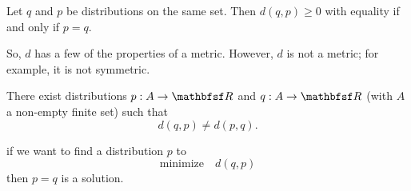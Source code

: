 \begin{prop}

Let $q$ and $p$ be distributions
on the same set.
Then $d(q, p) \geq 0$ with equality if and only if $p = q$.

\end{prop}

So, $d$ has a few of the properties of a metric.
However, $d$ is not a metric; for example, it is not symmetric.

\begin{prop}
  There exist distributions $p: A \to \R$ and $q: A \to \R$ (with $A$ a non-empty finite set) such that $$d(q, p) \neq d(p, q).$$
\end{prop}


if we want to find a distribution $p$
to
\[
  \text{minimize} \quad d(q, p)
\]
then $p = q$ is a solution.
\strats
